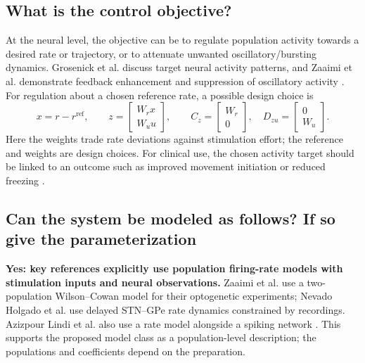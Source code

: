 ﻿\documentclass[11pt,a4paper]{article}
\begin{document}
\subsection*{What is the control objective?}
At the neural level, the objective can be to regulate population
activity towards a desired rate or trajectory, or to attenuate unwanted
oscillatory/bursting dynamics. Grosenick et al. discuss target neural
activity patterns, and Zaaimi et al. demonstrate feedback enhancement
and suppression of oscillatory activity \cite{grosenick2015,zaaimi2023}.
For regulation about a chosen reference rate, a possible design choice is
\begin{equation*}
x=r-r^{\mathrm{ref}},\qquad
z=\begin{bmatrix}W_r x\\W_u u\end{bmatrix},\qquad
C_z=\begin{bmatrix}W_r\\0\end{bmatrix},\quad
D_{zu}=\begin{bmatrix}0\\W_u\end{bmatrix}.
\end{equation*}
Here the weights trade rate deviations against stimulation effort;
the reference and weights are design choices. For clinical use, the
chosen activity target should be linked to an outcome such as improved
movement initiation or reduced freezing \cite{koehler2024,yin2022}.

\subsection*{Can the system be modeled as follows? If so give the parameterization}
\textbf{Yes: key references explicitly use population firing-rate
models with stimulation inputs and neural observations.}
Zaaimi et al. use a two-population Wilson--Cowan model for their
optogenetic experiments; Nevado Holgado et al. use delayed STN--GPe
rate dynamics constrained by recordings. Azizpour Lindi et al. also
use a rate model alongside a spiking network
\cite{zaaimi2023,nevado2010,lindi2024}.
This supports the proposed model class as a population-level
description; the populations and coefficients depend on the preparation.
\end{document}
